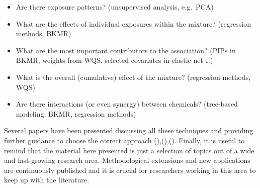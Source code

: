 \documentclass[
]{book}
\providecommand{\tightlist}{%
  \setlength{\itemsep}{0pt}\setlength{\parskip}{0pt}}
\begin{document}
\begin{itemize}
  \begin{itemize}
  \tightlist
  \item
    Are there exposure patterns? (unsupervised analysis, e.g.~PCA)
  \item
    What are the effects of individual exposures within the mixture? (regression methods, BKMR)
  \item
    What are the most important contributors to the association? (PIPs in BKMR, weights from WQS, selected covariates in elastic net \ldots)
  \item
    What is the overall (cumulative) effect of the mixture? (regression methods, WQS)
  \item
    Are there interactions (or even synergy) between chemicals? (tree-based modeling, BKMR, regression methods)
  \end{itemize}
\end{itemize}

Several papers have been presented discussing all these techniques and providing further guidance to choose the correct approach (\citet{hamra2018environmental}),(\citet{stafoggia2017statistical}),(\citet{gibson2019overview}). Finally, it is useful to remind that the material here presented is just a selection of topics out of a wide and fast-growing research area. Methodological extensions and new applications are continuously published and it is crucial for researchers working in this area to keep up with the literature.

  
\end{document}
